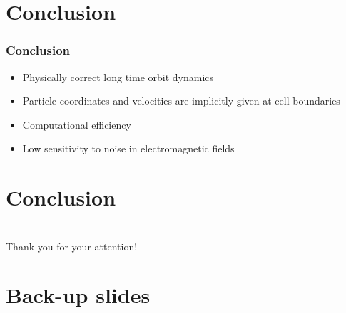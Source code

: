 \documentclass{beamer}
\begin{document}
\section{Conclusion}
\begin{frame}
\frametitle{Conclusion}
\vspace*{-0.5cm}
\begin{itemize}
\item Physically correct long time orbit dynamics
\item Particle coordinates and velocities are implicitly given at cell boundaries
\item Computational efficiency
\item Low sensitivity to noise in electromagnetic fields

\end{itemize}
\end{frame}

\section{Conclusion}



\section{ }
 \begin{frame}
\vspace*{2.5cm}
\centerline{\huge Thank you for your attention!}
 \end{frame}

\section{Back-up slides}
\end{document}
